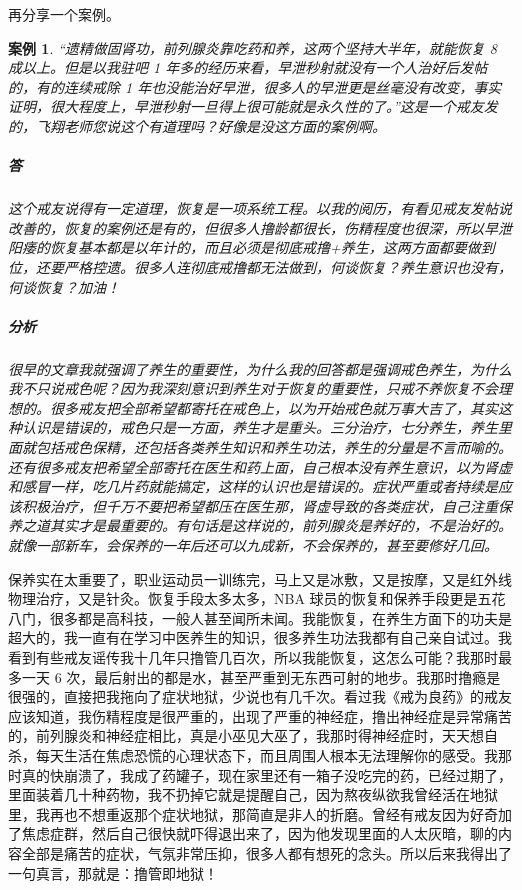 \documentclass[fontset=founder]{ctexart}
\newtheorem{case}{案例}
\begin{document}
再分享一个案例。

\begin{case}
    “遗精做固肾功，前列腺炎靠吃药和养，这两个坚持大半年，就能恢复 8 成以上。但是以我驻吧 1 年多的经历来看，早泄秒射就没有一个人治好后发帖的，有的连续戒除 1 年也没能治好早泄，很多人的早泄更是丝毫没有改变，事实证明，很大程度上，早泄秒射一旦得上很可能就是永久性的了。”这是一个戒友发的，飞翔老师您说这个有道理吗？好像是没这方面的案例啊。
    \subparagraph{答} 这个戒友说得有一定道理，恢复是一项系统工程。以我的阅历，有看见戒友发帖说改善的，恢复的案例还是有的，但很多人撸龄都很长，伤精程度也很深，所以早泄阳痿的恢复基本都是以年计的，而且必须是彻底戒撸+养生，这两方面都要做到位，还要严格控遗。很多人连彻底戒撸都无法做到，何谈恢复？养生意识也没有，何谈恢复？加油！
    \subparagraph{分析} 很早的文章我就强调了养生的重要性，为什么我的回答都是强调戒色养生，为什么我不只说戒色呢？因为我深刻意识到养生对于恢复的重要性，只戒不养恢复不会理想的。很多戒友把全部希望都寄托在戒色上，以为开始戒色就万事大吉了，其实这种认识是错误的，戒色只是一方面，养生才是重头。三分治疗，七分养生，养生里面就包括戒色保精，还包括各类养生知识和养生功法，养生的分量是不言而喻的。还有很多戒友把希望全部寄托在医生和药上面，自己根本没有养生意识，以为肾虚和感冒一样，吃几片药就能搞定，这样的认识也是错误的。症状严重或者持续是应该积极治疗，但千万不要把希望都压在医生那，肾虚导致的各类症状，自己注重保养之道其实才是最重要的。有句话是这样说的，前列腺炎是养好的，不是治好的。就像一部新车，会保养的一年后还可以九成新，不会保养的，甚至要修好几回。
\end{case}

保养实在太重要了，职业运动员一训练完，马上又是冰敷，又是按摩，又是红外线物理治疗，又是针灸。恢复手段太多太多，NBA 球员的恢复和保养手段更是五花八门，很多都是高科技，一般人甚至闻所未闻。我能恢复，在养生方面下的功夫是超大的，我一直有在学习中医养生的知识，很多养生功法我都有自己亲自试过。我看到有些戒友谣传我十几年只撸管几百次，所以我能恢复，这怎么可能？我那时最多一天 6 次，最后射出的都是水，甚至严重到无东西可射的地步。我那时撸瘾是很强的，直接把我拖向了症状地狱，少说也有几千次。看过我《戒为良药》的戒友应该知道，我伤精程度是很严重的，出现了严重的神经症，撸出神经症是异常痛苦的，前列腺炎和神经症相比，真是小巫见大巫了，我那时得神经症时，天天想自杀，每天生活在焦虑恐慌的心理状态下，而且周围人根本无法理解你的感受。我那时真的快崩溃了，我成了药罐子，现在家里还有一箱子没吃完的药，已经过期了，里面装着几十种药物，我不扔掉它就是提醒自己，因为熬夜纵欲我曾经活在地狱里，我再也不想重返那个症状地狱，那简直是非人的折磨。曾经有戒友因为好奇加了焦虑症群，然后自己很快就吓得退出来了，因为他发现里面的人太灰暗，聊的内容全部是痛苦的症状，气氛非常压抑，很多人都有想死的念头。所以后来我得出了一句真言，那就是：撸管即地狱！
\end{document}
